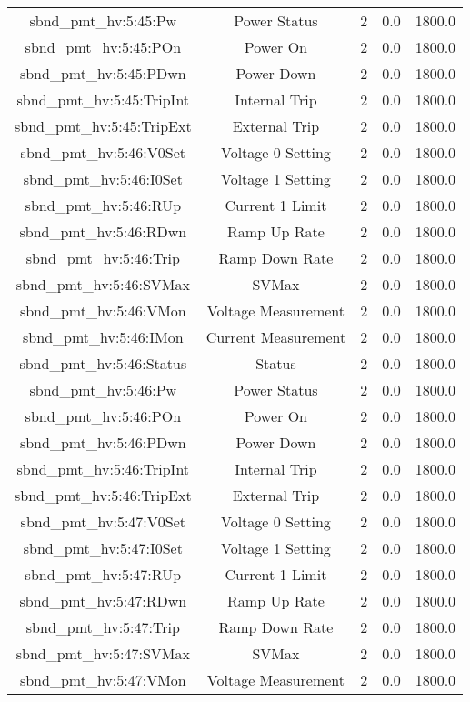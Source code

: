 \begin{center}
\begin{longtable}{c | c c c c }
sbnd\_pmt\_hv:5:45:Pw & Power Status & 2 & 0.0 & 1800.0\\ 
sbnd\_pmt\_hv:5:45:POn & Power On & 2 & 0.0 & 1800.0\\ 
sbnd\_pmt\_hv:5:45:PDwn & Power Down & 2 & 0.0 & 1800.0\\ 
sbnd\_pmt\_hv:5:45:TripInt & Internal Trip & 2 & 0.0 & 1800.0\\ 
sbnd\_pmt\_hv:5:45:TripExt & External Trip & 2 & 0.0 & 1800.0\\ 
sbnd\_pmt\_hv:5:46:V0Set & Voltage 0 Setting & 2 & 0.0 & 1800.0\\ 
sbnd\_pmt\_hv:5:46:I0Set & Voltage 1 Setting & 2 & 0.0 & 1800.0\\ 
sbnd\_pmt\_hv:5:46:RUp & Current 1 Limit & 2 & 0.0 & 1800.0\\ 
sbnd\_pmt\_hv:5:46:RDwn & Ramp Up Rate & 2 & 0.0 & 1800.0\\ 
sbnd\_pmt\_hv:5:46:Trip & Ramp Down Rate & 2 & 0.0 & 1800.0\\ 
sbnd\_pmt\_hv:5:46:SVMax & SVMax & 2 & 0.0 & 1800.0\\ 
sbnd\_pmt\_hv:5:46:VMon & Voltage Measurement & 2 & 0.0 & 1800.0\\ 
sbnd\_pmt\_hv:5:46:IMon & Current Measurement & 2 & 0.0 & 1800.0\\ 
sbnd\_pmt\_hv:5:46:Status & Status & 2 & 0.0 & 1800.0\\ 
sbnd\_pmt\_hv:5:46:Pw & Power Status & 2 & 0.0 & 1800.0\\ 
sbnd\_pmt\_hv:5:46:POn & Power On & 2 & 0.0 & 1800.0\\ 
sbnd\_pmt\_hv:5:46:PDwn & Power Down & 2 & 0.0 & 1800.0\\ 
sbnd\_pmt\_hv:5:46:TripInt & Internal Trip & 2 & 0.0 & 1800.0\\ 
sbnd\_pmt\_hv:5:46:TripExt & External Trip & 2 & 0.0 & 1800.0\\ 
sbnd\_pmt\_hv:5:47:V0Set & Voltage 0 Setting & 2 & 0.0 & 1800.0\\ 
sbnd\_pmt\_hv:5:47:I0Set & Voltage 1 Setting & 2 & 0.0 & 1800.0\\ 
sbnd\_pmt\_hv:5:47:RUp & Current 1 Limit & 2 & 0.0 & 1800.0\\ 
sbnd\_pmt\_hv:5:47:RDwn & Ramp Up Rate & 2 & 0.0 & 1800.0\\ 
sbnd\_pmt\_hv:5:47:Trip & Ramp Down Rate & 2 & 0.0 & 1800.0\\ 
sbnd\_pmt\_hv:5:47:SVMax & SVMax & 2 & 0.0 & 1800.0\\ 
sbnd\_pmt\_hv:5:47:VMon & Voltage Measurement & 2 & 0.0 & 1800.0\\ 

\end{longtable}
\end{center}
